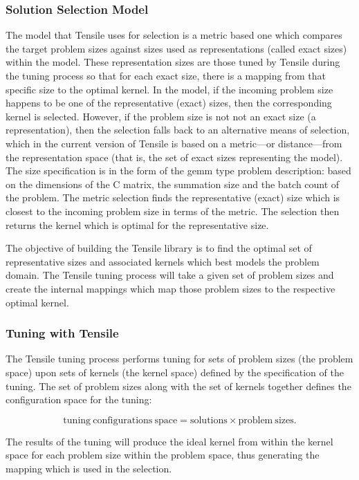 \documentclass[]{article}
\begin{document}
\subsubsection{Solution Selection Model}

The model that Tensile uses for selection is a metric based one which compares the target problem sizes against sizes used as representations (called exact sizes) within the model. These representation sizes are those tuned by Tensile during the tuning process so that for each exact size, there is a mapping from that specific size to the optimal kernel. In the model, if the incoming problem size happens to be one of the representative (exact) sizes, then the corresponding kernel is selected. However, if the problem size is not not an exact size (a representation), then the selection falls back to an alternative means of selection, which in the current version of Tensile is based on a metric---or distance---from the representation space (that is, the set of exact sizes representing the model). The size specification is in the form of the gemm type problem description: based on the dimensions of the C matrix, the summation size and the batch count of the problem. The metric selection finds the representative (exact) size which is closest to the incoming problem size in terms of the metric. The selection then returns the kernel which is optimal for the representative size.

The objective of building the Tensile library is to find the optimal set of representative sizes and associated kernels which best models the problem domain. The Tensile tuning process will take a given set of problem sizes and create the internal mappings which map those problem sizes to the respective optimal kernel.

\subsubsection{Tuning with Tensile}

The Tensile tuning process performs tuning for sets of problem sizes (the problem space) upon sets of kernels (the kernel space) defined by the specification of the tuning. The set of problem sizes along with the set of kernels together defines the configuration space for the tuning:

\begin{figure}[h]

	\[ \mathrm{tuning\ configurations\ space} = \mathrm{solutions} \times \mathrm{problem\ sizes}. \]

\end{figure}
\noindent
The results of the tuning will produce the ideal kernel from within the kernel space for each problem size within the problem space, thus generating the mapping which is used in the selection.
\end{document}
